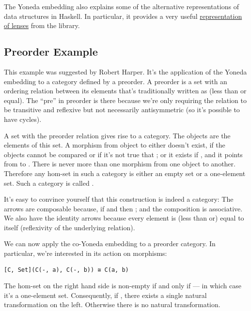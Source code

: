 The Yoneda embedding also explains some of the alternative
representations of data structures in Haskell. In particular, it
provides a very useful
\href{https://bartoszmilewski.com/2015/07/13/from-lenses-to-yoneda-embedding/}{representation
of lenses} from the  library.

\subsection{Preorder Example}\label{preorder-example}

This example was suggested by Robert Harper. It's the application of the
Yoneda embedding to a category defined by a preorder. A preorder is a
set with an ordering relation between its elements that's traditionally
written as \code{\textless{}=} (less than or equal). The ``pre'' in
preorder is there because we're only requiring the relation to be
transitive and reflexive but not necessarily antisymmetric (so it's
possible to have cycles).

A set with the preorder relation gives rise to a category. The objects
are the elements of this set. A morphism from object  to
 either doesn't exist, if the objects cannot be compared or if
it's not true that ; or it exists if
, and it points from  to
. There is never more than one morphism from one object to
another. Therefore any hom-set in such a category is either an empty set
or a one-element set. Such a category is called .

It's easy to convince yourself that this construction is indeed a
category: The arrows are composable because, if
 and  then
; and the composition is associative. We also
have the identity arrows because every element is (less than or) equal
to itself (reflexivity of the underlying relation).

We can now apply the co-Yoneda embedding to a preorder category. In
particular, we're interested in its action on morphisms:

\begin{verbatim}
[C, Set](C(-, a), C(-, b)) ≅ C(a, b)
\end{verbatim}

The hom-set on the right hand side is non-empty if and only if
 --- in which case it's a one-element set.
Consequently, if , there exists a single
natural transformation on the left. Otherwise there is no natural
transformation.

